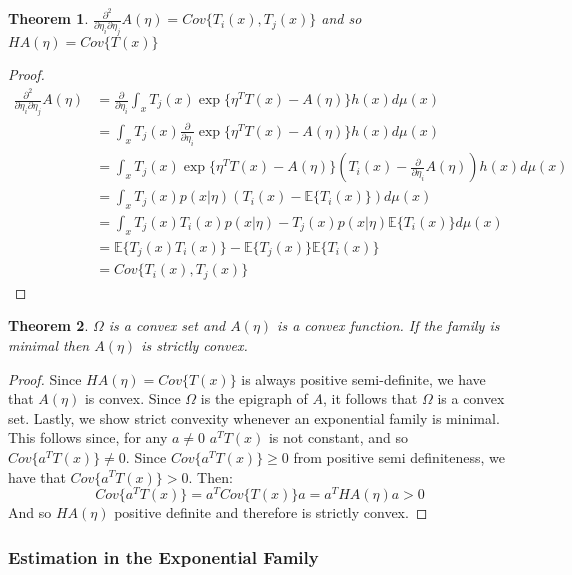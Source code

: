 \documentclass[]{article}
\theoremstyle{mattstyle}
\newtheorem{theorem}{Theorem}[section]
\theoremstyle{definition}
\begin{document}
\newpage

\begin{theorem}
	$\frac{\partial^2}{\partial \eta_i \partial \eta_j}A(\eta) = Cov\{T_i(x),T_j(x)\}$ and so $HA(\eta)=Cov\{T(x)\}$
\end{theorem}
\begin{proof}
	\begin{align*}
	\frac{\partial^2}{\partial \eta_i \partial \eta_j}A(\eta) &= \frac{\partial}{\partial \eta_i}\int_x T_j(x)\exp\{ \eta^TT(x)-A(\eta)\}h(x)d\mu(x)\\
	&= \int_x T_j(x)\frac{\partial}{\partial \eta_i}\exp\{ \eta^TT(x)-A(\eta)\}h(x)d\mu(x)\\
	&= \int_x T_j(x)\exp\{ \eta^TT(x)-A(\eta)\}\left( T_i(x) - \frac{\partial}{\partial \eta_i}A(\eta) \right)h(x)d\mu(x)\\
	&= \int_x T_j(x)p(x|\eta)\left( T_i(x) - \mathbb{E}\{T_i(x)\} \right) d\mu(x)\\
	&= \int_x T_j(x)T_i(x)p(x|\eta) - T_j(x)p(x|\eta)\mathbb{E}\{T_i(x)\} d\mu(x)\\
	&= \mathbb{E}\{T_j(x)T_i(x)\} - \mathbb{E}\{T_j(x)\}\mathbb{E}\{T_i(x)\}\\
	&= Cov\{T_i(x), T_j(x)\}
	\end{align*}
\end{proof}

\begin{theorem}
	$\Omega$ is a convex set and $A(\eta)$ is a convex function. If the family is minimal then $A(\eta)$ is strictly convex.
\end{theorem}
\begin{proof}
	Since $HA(\eta)=Cov\{T(x)\}$ is always positive semi-definite, we have that $A(\eta)$ is convex. Since $\Omega$ is the epigraph of $A$, it follows that $\Omega$ is a convex set. Lastly, we show strict convexity whenever an exponential family is minimal. This follows since, for any $a\ne0$ $a^TT(x)$ is not constant, and so $Cov\{a^TT(x)\}\ne0$. Since $Cov\{a^TT(x)\}\ge 0$ from positive semi definiteness, we have that $Cov\{a^TT(x)\}>0$.
	Then:
	$$Cov\{a^TT(x)\}=a^TCov\{T(x)\}a=a^THA(\eta)a>0$$
	And so $HA(\eta)$ positive definite and therefore is strictly convex.
\end{proof}

\newpage

\subsubsection{Estimation in the Exponential Family}
\end{document}
